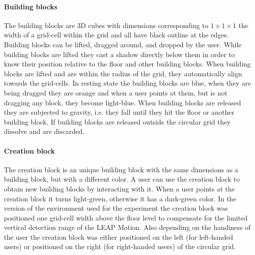\paragraph{Building blocks}
The building blocks are 3D cubes with dimensions corresponding to $1\times 1\times 1$ the width of a grid-cell within the grid and all have black outline at the edges. Building blocks can be lifted, dragged around, and dropped by the user. While building blocks are lifted they cast a shadow directly below them in order to know their position relative to the floor and other building blocks. When building blocks are lifted and are within the radius of the grid, they automatically align towards the grid-cells. In resting state the building blocks are blue, when they are being dragged they are orange and when a user points at them, but is not dragging any block, they become light-blue. When building blocks are released they are subjected to gravity, i.e. they fall until they hit the floor or another building block. If building blocks are released outside the circular grid they dissolve and are discarded.

\paragraph{Creation block}
The creation block is an unique building block with the same dimensions as a building block, but with a different color. A user can use the creation block to obtain new building blocks by interacting with it. When a user points at the creation block it turns light-green, otherwise it has a dark-green color. In the version of the environment used for the experiment the creation block was positioned one grid-cell width above the floor level to compensate for the limited vertical detection range of the LEAP Motion. Also depending on the handiness of the user the creation block was either positioned on the left (for left-handed users) or positioned on the right (for right-handed users) of the circular grid.

